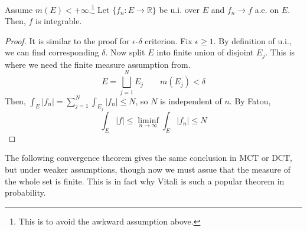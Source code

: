  \begin{lemma}
    Assume $m(E) < +\infty$.\footnote{This is to avoid the awkward assumption above.} Let $\{f_n: E \to \mathbb{R}\}$ be u.i. over $E$ and $f_n \to f$ a.e. on $E$. Then, $f$ is integrable. 
  \end{lemma}
  \begin{proof}
    It is similar to the proof for $\epsilon$-$\delta$ criterion. Fix $\epsilon \geq 1$. By definition of u.i., we can find corresponding $\delta$. Now split $E$ into finite union of disjoint $E_j$. This is where we need the finite measure assumption from. 
    \begin{equation}
      E = \bigsqcup_{j=1}^N E_j \qquad m(E_j) < \delta
    \end{equation}
    Then, $\int_E |f_n| = \sum_{j=1}^N \int_{E_j} |f_n| \leq N$, so $N$ is independent of $n$. By Fatou, 
    \begin{equation}
      \int_E |f| \leq \liminf_{n \to \infty} \int_E |f_n| \leq N
    \end{equation}
  \end{proof}

  The following convergence theorem gives the same conclusion in MCT or DCT, but under weaker assumptions, though now we must assue that the measure of the whole set is finite. This is in fact why Vitali is such a popular theorem in probability. 

